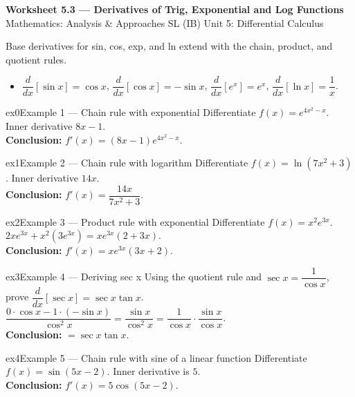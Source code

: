 \documentclass[11pt]{article}
\begin{document}
\begin{center}
{\LARGE\bfseries\color{titleblue}Worksheet 5.3 --- Derivatives of Trig, Exponential and Log Functions}\\[2pt]
{\small Mathematics: Analysis \& Approaches SL (IB) \textperiodcentered{} Unit 5: Differential Calculus}
\end{center}

\begin{ideabox}
Base derivatives for sin, cos, exp, and ln extend with the chain, product, and quotient rules.
\begin{itemize}[leftmargin=*,itemsep=2pt]
  \item $\dfrac{d}{dx}[\sin x]=\cos x$, $\dfrac{d}{dx}[\cos x]=-\sin x$, $\dfrac{d}{dx}[e^x]=e^x$, $\dfrac{d}{dx}[\ln x]=\dfrac1x$.
\end{itemize}
\end{ideabox}


\begin{example}{ex0}{Example 1 --- Chain rule with exponential}
Differentiate $f(x)=e^{4x^2-x}$.\soln
Inner derivative $8x-1$.\\[3pt]\textbf{Conclusion:} $f'(x)=(8x-1)e^{4x^2-x}$.
\end{example}

\begin{example}{ex1}{Example 2 --- Chain rule with logarithm}
Differentiate $f(x)=\ln(7x^2+3)$.\soln
Inner derivative $14x$.\\[3pt]\textbf{Conclusion:} $f'(x)=\dfrac{14x}{7x^2+3}$.
\end{example}

\begin{example}{ex2}{Example 3 --- Product rule with exponential}
Differentiate $f(x)=x^2e^{3x}$.\soln
$2xe^{3x}+x^2(3e^{3x})=xe^{3x}(2+3x)$.\\[3pt]\textbf{Conclusion:} $f'(x)=xe^{3x}(3x+2)$.
\end{example}

\begin{example}{ex3}{Example 4 --- Deriving sec x}
Using the quotient rule and $\sec x=\dfrac{1}{\cos x}$, prove $\dfrac{d}{dx}[\sec x]=\sec x\tan x$.\soln
$\dfrac{0\cdot\cos x-1\cdot(-\sin x)}{\cos^2x}=\dfrac{\sin x}{\cos^2x}=\dfrac1{\cos x}\cdot\dfrac{\sin x}{\cos x}$.\\[3pt]\textbf{Conclusion:} $=\sec x\tan x$.
\end{example}

\begin{example}{ex4}{Example 5 --- Chain rule with sine of a linear function}
Differentiate $f(x)=\sin(5x-2)$.\soln
Inner derivative is $5$.\\[3pt]\textbf{Conclusion:} $f'(x)=5\cos(5x-2)$.
\end{example}
\end{document}
